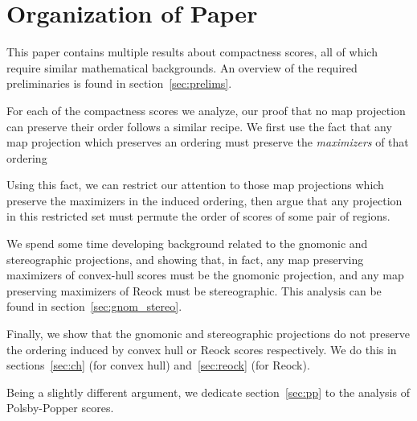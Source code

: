 \section{Organization of Paper}
This paper contains multiple results about compactness 
scores, all of which require similar mathematical 
backgrounds. An overview of the required preliminaries 
is found in section~\ref{sec:prelims}.

For each of the compactness scores we analyze, our proof that no map
projection can preserve their order follows a similar recipe. We
first use the fact that any map projection which preserves an ordering
must preserve the \textit{maximizers} of that ordering

Using this fact, we can restrict our attention to those map
projections which preserve the maximizers in the induced ordering,
then argue that any projection in this restricted set must permute the
order of scores of some pair of regions.

We spend some time developing background related to 
the gnomonic and stereographic projections, and showing 
that, in fact, any map preserving maximizers 
of convex-hull scores must be the gnomonic projection, 
and any map preserving maximizers of Reock must be stereographic. 
This analysis can be found in section~\ref{sec:gnom_stereo}.

Finally, we show that the gnomonic and stereographic 
projections do not preserve the ordering induced by convex 
hull or Reock scores respectively. We do this in 
sections~\ref{sec:ch} (for convex hull) and~\ref{sec:reock} (for Reock). 

Being a slightly different argument, we dedicate 
section~\ref{sec:pp} to the analysis of Polsby-Popper scores.


